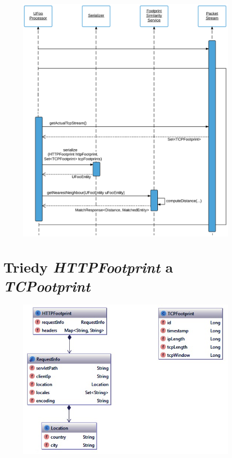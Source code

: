 \documentclass[
  printed, %
  table,   %
  lof,     %
  nolot,   %
  nocover
]{fithesis3}
\begin{document}
\begin{figure}[h]
  \centering
    \includegraphics[width=1.1\textwidth]{images/footprint-impl-flow-2.png}
\end{figure}

\chapter{Triedy \textit{HTTPFootprint} a \textit{TCPootprint}}
\label{fig:appendix-structure}
\begin{figure}[h]
  \centering
    \includegraphics[width=\textwidth]{images/appendix-structure.png}
\end{figure}
\end{document}
